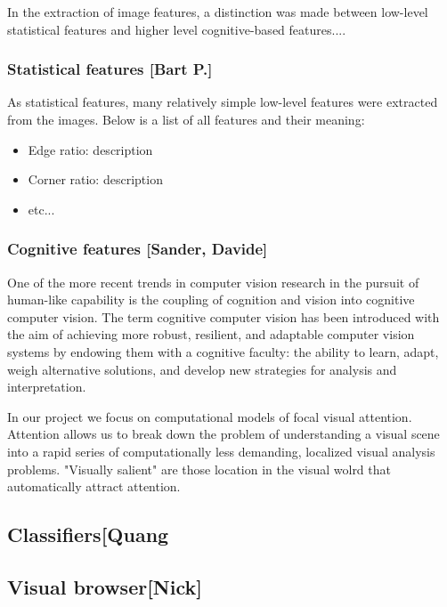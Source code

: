 In the extraction of image features, a distinction was made between low-level statistical features and higher level cognitive-based features....

\subsubsection{Statistical features [Bart P.]}
As statistical features, many relatively simple low-level features were extracted from the images. Below is a list of all features and their meaning:
\begin{itemize}
\item Edge ratio: description
\item Corner ratio: description
\item etc...
\end{itemize}

\subsubsection{Cognitive features [Sander, Davide]}
One of the more recent trends in computer vision research in the pursuit of human-like capability is the coupling of cognition and vision into cognitive computer vision. 
The term cognitive computer vision has been introduced with the aim of achieving more robust, resilient, and adaptable computer vision systems by endowing them with a cognitive faculty: the ability to learn, adapt, weigh alternative solutions, and develop new strategies for analysis and interpretation.

In our project we focus on computational models of focal visual attention. Attention allows us to break down the problem of understanding a visual scene into a rapid series of computationally less demanding, localized visual analysis problems. 
"Visually salient" are those location in the visual wolrd that automatically attract attention.

\subsection{Classifiers[Quang}


\subsection{Visual browser[Nick]}

